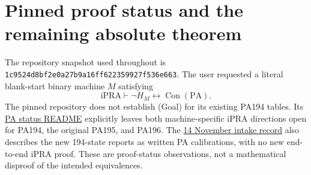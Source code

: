 \section{Pinned proof status and the remaining absolute theorem}
\label{sec:proof-status}

The repository snapshot used throughout is
\texttt{1c9524d8bf2e0a27b9a16ff622359927f536e663}.
The user requested a literal blank-start binary machine $M$ satisfying
\[
 \mathrm{iPRA}\vdash
       \neg H_M\leftrightarrow\operatorname{Con}(\mathrm{PA}).
                                                               \tag{Goal}
\]
The pinned repository does not establish (Goal) for its existing PA194
tables. Its \href{https://github.com/VladimirReshetnikov/ProveIt/blob/1c9524d8bf2e0a27b9a16ff622359927f536e663/Computability/BusyBeaver/Research/PA/README.md}{PA status README}
explicitly leaves both machine-specific iPRA directions open for PA194,
the original PA195, and PA196. The
\href{https://github.com/VladimirReshetnikov/ProveIt/blob/1c9524d8bf2e0a27b9a16ff622359927f536e663/Computability/BusyBeaver/Research/PA/INCOMING-2026-11-14.md}{14 November intake record}
also describes the new 194-state reports as written PA calibrations,
with no new end-to-end iPRA proof. These are proof-status observations,
not a mathematical disproof of the intended equivalences.

